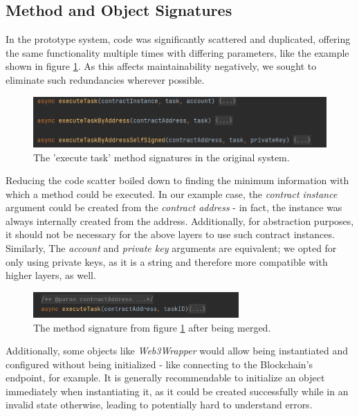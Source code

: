 \subsection{Method and Object Signatures}
\label{sec:impr:enzian:sig}

In the prototype system, code was significantly scattered and duplicated, offering the same functionality multiple times with differing parameters, like the example shown in figure \ref{fig:impr:enzian:sig-pre}. As this affects maintainability negatively, we sought to eliminate such redundancies wherever possible.

\begin{figure}[h]
	\centering
	\captionsetup{justification=centering,margin=2cm}
	\includegraphics[width=\textwidth]{gfx/enzian-signatures-pre}
	\caption{The 'execute task' method signatures in the original system.}
	\label{fig:impr:enzian:sig-pre}
\end{figure}

Reducing the code scatter boiled down to finding the minimum information with which a method could be executed. In our example case, the \emph{contract instance} argument could be created from the \emph{contract address} - in fact, the instance was always internally created from the address. Additionally, for abstraction purposes, it should not be necessary for the above layers to use such contract instances. Similarly, The \emph{account} and \emph{private key} arguments are equivalent; we opted for only using private keys, as it is a string and therefore more compatible with higher layers, as well.

\begin{figure}[h]
	\centering
	\captionsetup{justification=centering,margin=2cm}
	\includegraphics[width=0.7\textwidth]{gfx/enzian-signatures-post}
	\caption{The method signature from figure \ref{fig:impr:enzian:sig-pre} after being merged.}
	\label{fig:impr:enzian:sig-post}
\end{figure}

Additionally, some objects like \emph{Web3Wrapper} would allow being instantiated and configured without being initialized - like connecting to the Blockchain's endpoint, for example. It is generally recommendable to initialize an object immediately when instantiating it, as it could be created successfully while in an invalid state otherwise, leading to potentially hard to understand errors.

